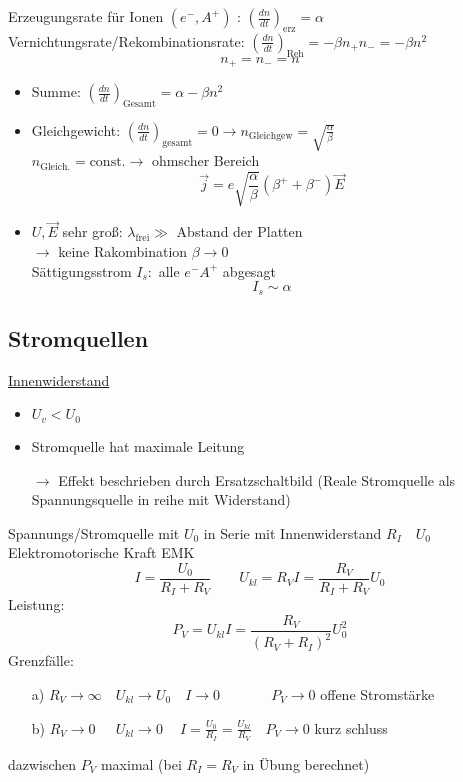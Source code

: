 \documentclass[titlepage,12pt,a4paper,ngerman]{report}
\newcommand{\tx}[1]{\textrm{#1}}
\begin{document}

\noindent
Erzeugungsrate für Ionen $ (e^-,A^+) $ : $ (\frac{dn}{dt})_{\tx{erz}} = \alpha $\\
Vernichtungsrate/Rekombinationsrate: $ (\frac{dn}{dt})_{\tx{Reh}}  = -\beta n_+ n_- = - \beta n^2$
$$ n_+ = n_- = n $$
\begin{itemize}
	\item Summe:  $ (\frac{dn}{dt}) _{\tx{Gesamt}} = \alpha - \beta n^2 $\\
	\item Gleichgewicht: $ (\frac{dn}{dt})_{\tx{gesamt}} = 0 \rightarrow n_{\tx{Gleichgew}} = \sqrt{\frac{\alpha}{\beta}} $\\
	$ n_{\tx{Gleich.}} = \tx{const.} \rightarrow $ ohmscher Bereich
	$$ \vec{j} = e \sqrt{\frac{\alpha}{\beta}} (\beta^+ + \beta^- ) \vec{E}$$
	\item $ U,\vec{E} $ sehr groß: $ \lambda_{\tx{frei}} \gg $ Abstand der Platten\\
	$ \rightarrow $ keine Rakombination $ \beta \rightarrow 0 $\\
	Sättigungsstrom $ I_s: $ alle $ e^- A^+ $ abgesagt
	$$ I_s \sim \alpha$$
\end{itemize}
\subsection{Stromquellen}
\underline{Innenwiderstand}
\begin{itemize}
	\item $ U_v < U_0 $
	\item Stromquelle hat maximale Leitung
	\item[$ \rightarrow $] Effekt beschrieben durch Ersatzschaltbild (Reale Stromquelle als Spannungsquelle in reihe mit Widerstand)
\end{itemize}
Spannungs/Stromquelle mit $ U_0 $ in Serie mit Innenwiderstand $ R_I \quad U_0 $ Elektromotorische Kraft EMK
$$I = \frac{U_0}{R_I+R_V} \qquad U_{kl} = R_V I = \frac{R_V}{R_I+R_V}U_0$$
Leistung: $$P_V = U_{kl} I = \frac{R_V}{(R_V+R_I)^2} U_0^2$$
Grenzfälle: \begin{itemize}
	\item [a)] $ R_V \rightarrow \infty \quad U_{kl} \rightarrow U_0 \quad I \rightarrow 0 \qquad \quad \ \ \: P_V \rightarrow 0 $ offene Stromstärke
	\item [b)] $R_V \rightarrow 0 \ \ \quad U_{kl} \rightarrow 0 \ \quad I = \frac{U_0}{R_I}= \frac{U_{kl}}{R_V} \quad P_V \rightarrow0 $ kurz schluss
\end{itemize}
dazwischen $ P_V $ maximal (bei $ R_I = R_V $ in Übung berechnet)
\end{document}
